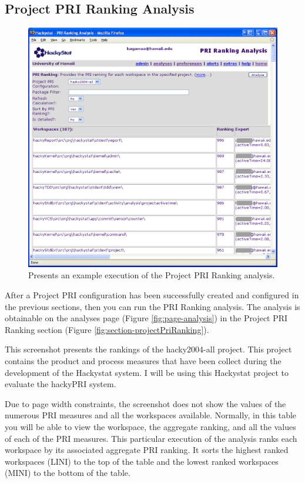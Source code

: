 \subsection{Project PRI Ranking Analysis}
\label{subsection:projectPriRanking}
\begin{figure}[ht]
  \centering
  \includegraphics[width=1.00\textwidth]{figs/UserInterface/analysis-priRanking-sortByRanking-full-hidden.eps}
  \caption[Execution of the Project PRI Ranking analysis]{Presents an
    example execution of the Project PRI Ranking analysis.}  
  \label{fig:analysis-priRanking-full}
\end{figure}
After a Project PRI configuration has been successfully created and
configured in the previous sections, then you can run the PRI Ranking
analysis. The analysis is obtainable on the analyses page (Figure
\ref{fig:page-analysis}) in the Project PRI Ranking section (Figure
\ref{fig:section-projectPriRanking}).

This screenshot presents the rankings of the hacky2004-all project. This
project contains the product and process measures that have been collect
during the development of the Hackystat system. I will be using this
Hackystat project to evaluate the hackyPRI system. 

Due to page width constraints, the screenshot does not show the values of
the numerous PRI measures and all the workspaces available. Normally, in
this table you will be able to view the workspace, the aggregate ranking,
and all the values of each of the PRI measures. This particular execution
of the analysis  ranks each workspace by its associated aggregate PRI
ranking. It sorts the highest ranked workspaces (LINI) to the top of the
table and the lowest ranked workspaces (MINI) to the bottom of the table.

